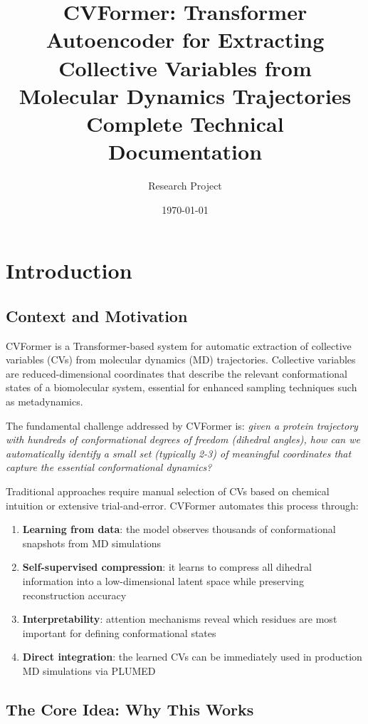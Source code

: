 \documentclass[12pt,a4paper]{article}
\title{\textbf{CVFormer: Transformer Autoencoder for Extracting Collective Variables from Molecular Dynamics Trajectories}\\[0.5cm]
\large Complete Technical Documentation}
\author{Research Project}
\date{\today}
\begin{document}
\maketitle
\tableofcontents
\newpage

\section{Introduction}

\subsection{Context and Motivation}
CVFormer is a Transformer-based system for automatic extraction of collective variables (CVs) from molecular dynamics (MD) trajectories. Collective variables are reduced-dimensional coordinates that describe the relevant conformational states of a biomolecular system, essential for enhanced sampling techniques such as metadynamics.

The fundamental challenge addressed by CVFormer is: \textit{given a protein trajectory with hundreds of conformational degrees of freedom (dihedral angles), how can we automatically identify a small set (typically 2-3) of meaningful coordinates that capture the essential conformational dynamics?}

Traditional approaches require manual selection of CVs based on chemical intuition or extensive trial-and-error. CVFormer automates this process through:
\begin{enumerate}
    \item \textbf{Learning from data}: the model observes thousands of conformational snapshots from MD simulations
    \item \textbf{Self-supervised compression}: it learns to compress all dihedral information into a low-dimensional latent space while preserving reconstruction accuracy
    \item \textbf{Interpretability}: attention mechanisms reveal which residues are most important for defining conformational states
    \item \textbf{Direct integration}: the learned CVs can be immediately used in production MD simulations via PLUMED
\end{enumerate}

\subsection{The Core Idea: Why This Works}
\end{document}
